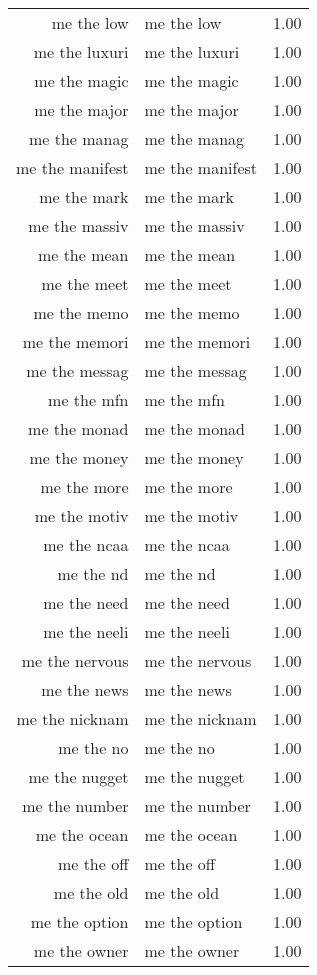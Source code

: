 \begin{table}[ht]
\begin{tabular}{rlr}
  me the low & me the low & 1.00 \\ 
  me the luxuri & me the luxuri & 1.00 \\ 
  me the magic & me the magic & 1.00 \\ 
  me the major & me the major & 1.00 \\ 
  me the manag & me the manag & 1.00 \\ 
  me the manifest & me the manifest & 1.00 \\ 
  me the mark & me the mark & 1.00 \\ 
  me the massiv & me the massiv & 1.00 \\ 
  me the mean & me the mean & 1.00 \\ 
  me the meet & me the meet & 1.00 \\ 
  me the memo & me the memo & 1.00 \\ 
  me the memori & me the memori & 1.00 \\ 
  me the messag & me the messag & 1.00 \\ 
  me the mfn & me the mfn & 1.00 \\ 
  me the monad & me the monad & 1.00 \\ 
  me the money & me the money & 1.00 \\ 
  me the more & me the more & 1.00 \\ 
  me the motiv & me the motiv & 1.00 \\ 
  me the ncaa & me the ncaa & 1.00 \\ 
  me the nd & me the nd & 1.00 \\ 
  me the need & me the need & 1.00 \\ 
  me the neeli & me the neeli & 1.00 \\ 
  me the nervous & me the nervous & 1.00 \\ 
  me the news & me the news & 1.00 \\ 
  me the nicknam & me the nicknam & 1.00 \\ 
  me the no & me the no & 1.00 \\ 
  me the nugget & me the nugget & 1.00 \\ 
  me the number & me the number & 1.00 \\ 
  me the ocean & me the ocean & 1.00 \\ 
  me the off & me the off & 1.00 \\ 
  me the old & me the old & 1.00 \\ 
  me the option & me the option & 1.00 \\ 
  me the owner & me the owner & 1.00 \\ 

\end{tabular}
\end{table}
